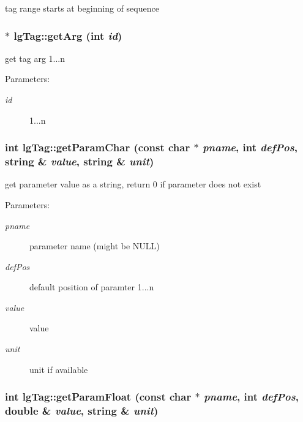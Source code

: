 tag range starts at beginning of sequence 
\subsubsection{ $\ast$ lg\-Tag::get\-Arg (int {\em id})}\label{classlgTag_a14}


get tag arg 1...n 

\begin{Desc}
\item[Parameters: ]\par
\begin{description}
\item[{\em 
id}]1...n \end{description}
\end{Desc}
\subsubsection{\setlength{\rightskip}{0pt plus 5cm}int lg\-Tag::get\-Param\-Char (const char $\ast$ {\em pname}, int {\em def\-Pos}, string \& {\em value}, string \& {\em unit})}\label{classlgTag_a1}


get parameter value as a string, return 0 if parameter does not exist 

\begin{Desc}
\item[Parameters: ]\par
\begin{description}
\item[{\em 
pname}]parameter name (might be NULL) \item[{\em 
def\-Pos}]default position of paramter 1...n \item[{\em 
value}]value \item[{\em 
unit}]unit if available \end{description}
\end{Desc}
\subsubsection{\setlength{\rightskip}{0pt plus 5cm}int lg\-Tag::get\-Param\-Float (const char $\ast$ {\em pname}, int {\em def\-Pos}, double \& {\em value}, string \& {\em unit})}\label{classlgTag_a3}


